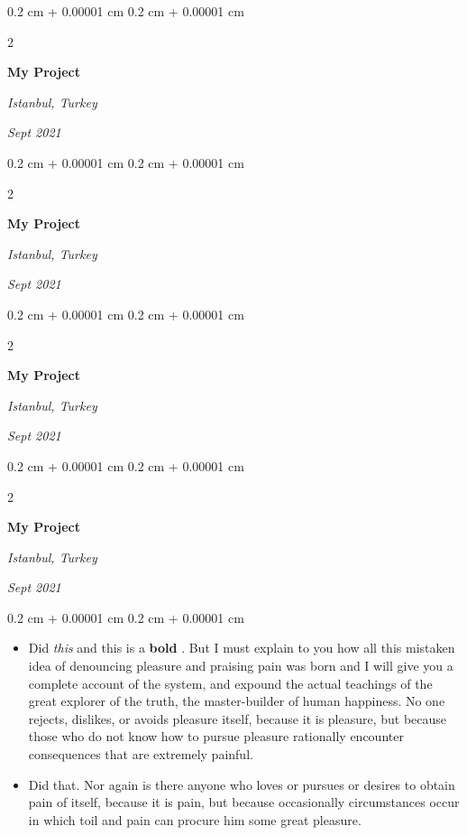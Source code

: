 \documentclass[10pt, letterpaper]{article}
\newenvironment{highlights}{
    \begin{itemize}[
        topsep=0.10 cm,
        parsep=0.10 cm,
        partopsep=0pt,
        itemsep=0pt,
        leftmargin=0.4 cm + 10pt
    ]
}{
    \end{itemize}
} %
\newenvironment{onecolentry}{
    \begin{adjustwidth}{
        0.2 cm + 0.00001 cm
    }{
        0.2 cm + 0.00001 cm
    }
}{
    \end{adjustwidth}
} %
\newenvironment{twocolentry}[2][]{
    \onecolentry
    \def\secondColumn{#2}
    \setcolumnwidth{\fill, 4.5 cm}
    \begin{paracol}{2}
}{
    \switchcolumn \raggedleft \secondColumn
    \end{paracol}
    \endonecolentry
} %
\let\hrefWithoutArrow\href
\renewcommand{\href}[2]{\hrefWithoutArrow{#1}{\ifthenelse{\equal{#2}{}}{ }{#2 }\raisebox{.15ex}{\footnotesize \faExternalLink*}}}
\begin{document}
        \vspace{0.2 cm}

        \begin{twocolentry}{
        \textit{Istanbul, Turkey}    
            
        \textit{Sept 2021}}
            \textbf{My Project}
        \end{twocolentry}



        \vspace{0.2 cm}

        \begin{twocolentry}{
        \textit{Istanbul, Turkey}    
            
        \textit{Sept 2021}}
            \textbf{My Project}
        \end{twocolentry}



        \vspace{0.2 cm}

        \begin{twocolentry}{
        \textit{Istanbul, Turkey}    
            
        \textit{Sept 2021}}
            \textbf{My Project}
        \end{twocolentry}



        \vspace{0.2 cm}

        \begin{twocolentry}{
        \textit{Istanbul, Turkey}    
            
        \textit{Sept 2021}}
            \textbf{My Project}
        \end{twocolentry}

        \vspace{0.10 cm}
        \begin{onecolentry}
            \begin{highlights}
                \item Did \textit{this} and this is a \textbf{bold} \href{https://example.com}{link}. But I must explain to you how all this mistaken idea of denouncing pleasure and praising pain was born and I will give you a complete account of the system, and expound the actual teachings of the great explorer of the truth, the master-builder of human happiness. No one rejects, dislikes, or avoids pleasure itself, because it is pleasure, but because those who do not know how to pursue pleasure rationally encounter consequences that are extremely painful.
                \item Did that. Nor again is there anyone who loves or pursues or desires to obtain pain of itself, because it is pain, but because occasionally circumstances occur in which toil and pain can procure him some great pleasure.
            \end{highlights}
        \end{onecolentry}
\end{document}
